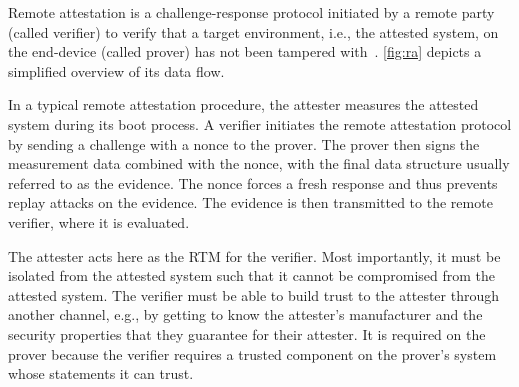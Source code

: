 



Remote attestation is a challenge-response protocol initiated by a remote party (called verifier) to verify that a target environment, i.e., the attested system, on the end-device (called prover) has not been tampered with~\cite{Menetrey2022, Coker2011}.
\autoref{fig:ra} depicts a simplified overview of its data flow.

In a typical remote attestation procedure, the attester measures the attested system during its boot process.
A verifier initiates the remote attestation protocol by sending a challenge with a nonce to the prover.
The prover then signs the measurement data combined with the nonce, with the final data structure usually referred to as the evidence.
The nonce forces a fresh response and thus prevents replay attacks on the evidence.
The evidence is then transmitted to the remote verifier, where it is evaluated.


The attester acts here as the \ac{RTM} for the verifier.
Most importantly, it must be isolated from the attested system such that it cannot be compromised from the attested system.
The verifier must be able to build trust to the attester through another channel, e.g., by getting to know the attester's manufacturer and the security properties that they guarantee for their attester.
It is required on the prover because the verifier requires a trusted component on the prover's system whose statements it can trust.

